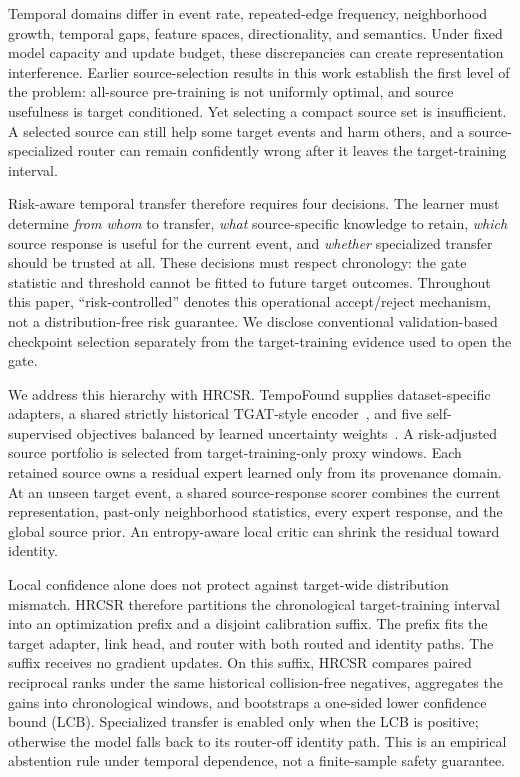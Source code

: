 \documentclass[journal]{IEEEtran}
\begin{document}
Temporal domains differ in event rate, repeated-edge frequency, neighborhood growth, temporal gaps, feature spaces, directionality, and semantics. Under fixed model capacity and update budget, these discrepancies can create representation interference. Earlier source-selection results in this work establish the first level of the problem: all-source pre-training is not uniformly optimal, and source usefulness is target conditioned. Yet selecting a compact source set is insufficient. A selected source can still help some target events and harm others, and a source-specialized router can remain confidently wrong after it leaves the target-training interval.

Risk-aware temporal transfer therefore requires four decisions. The learner must determine \emph{from whom} to transfer, \emph{what} source-specific knowledge to retain, \emph{which} source response is useful for the current event, and \emph{whether} specialized transfer should be trusted at all. These decisions must respect chronology: the gate statistic and threshold cannot be fitted to future target outcomes. Throughout this paper, ``risk-controlled'' denotes this operational accept/reject mechanism, not a distribution-free risk guarantee. We disclose conventional validation-based checkpoint selection separately from the target-training evidence used to open the gate.

We address this hierarchy with HRCSR. TempoFound supplies dataset-specific adapters, a shared strictly historical TGAT-style encoder~\cite{xu2020inductive}, and five self-supervised objectives balanced by learned uncertainty weights~\cite{kendall2018multi}. A risk-adjusted source portfolio is selected from target-training-only proxy windows. Each retained source owns a residual expert learned only from its provenance domain. At an unseen target event, a shared source-response scorer combines the current representation, past-only neighborhood statistics, every expert response, and the global source prior. An entropy-aware local critic can shrink the residual toward identity.

Local confidence alone does not protect against target-wide distribution mismatch. HRCSR therefore partitions the chronological target-training interval into an optimization prefix and a disjoint calibration suffix. The prefix fits the target adapter, link head, and router with both routed and identity paths. The suffix receives no gradient updates. On this suffix, HRCSR compares paired reciprocal ranks under the same historical collision-free negatives, aggregates the gains into chronological windows, and bootstraps a one-sided lower confidence bound (LCB). Specialized transfer is enabled only when the LCB is positive; otherwise the model falls back to its router-off identity path. This is an empirical abstention rule under temporal dependence, not a finite-sample safety guarantee.
\end{document}
